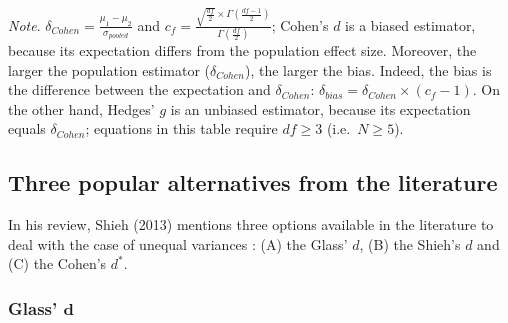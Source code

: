 \documentclass[
  english,
  man,floatsintext]{apa6}
\begin{document}
\begin{landscape}
\emph{Note}. \(\delta_{Cohen}= \frac{\mu_1-\mu_2}{\sigma_{pooled}}\) and \(c_f=\frac{\sqrt{\frac{df}{2}} \times \Gamma\left( \frac{df-1}{2}\right)}{\Gamma\left( \frac{df}{2}\right)}\); Cohen's \(d\) is a biased estimator, because its expectation differs from the population effect size. Moreover, the larger the population estimator (\(\delta_{Cohen}\)), the larger the bias. Indeed, the bias is the difference between the expectation and \(\delta_{Cohen}\): \(\delta_{bias} = \delta_{Cohen} \times (c_f-1)\). On the other hand, Hedges' \(g\) is an unbiased estimator, because its expectation equals \(\delta_{Cohen}\); equations in this table require \(df \ge 3\) (i.e.~\(N \ge 5\)).

\end{landscape}

\hypertarget{three-popular-alternatives-from-the-literature}{%
\subsection{Three popular alternatives from the literature}\label{three-popular-alternatives-from-the-literature}}

In his review, Shieh (2013) mentions three options available in the literature to deal with the case of unequal variances : (A) the Glass' \(d\), (B) the Shieh's \(d\) and (C) the Cohen's \(d^*\).

\hypertarget{glass-bmd}{%
\subsubsection{\texorpdfstring{Glass' \(\bm{d}\)}{Glass' \textbackslash bm\{d\}}}\label{glass-bmd}}
\end{document}
